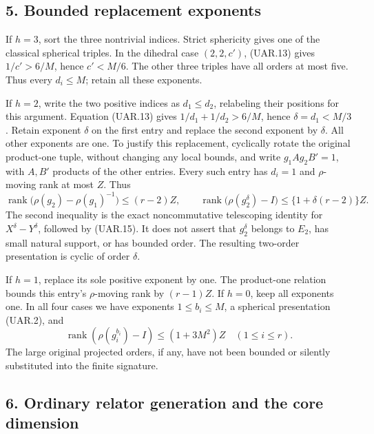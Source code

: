 \subsection*{5. Bounded replacement exponents}

If \(h=3\), sort the three nontrivial indices. Strict sphericity
gives one of the classical spherical triples. In the dihedral case
\((2,2,c')\), (UAR.13) gives \(1/c'>6/M\), hence \(c'<M/6\).
The other three triples have all orders at most five. Thus every
\(d_i\le M\); retain all these exponents.

If \(h=2\), write the two positive indices as \(d_1\le d_2\),
relabeling their positions for this argument. Equation (UAR.13)
gives \(1/d_1+1/d_2>6/M\), hence \(\delta=d_1<M/3\).
Retain exponent \(\delta\) on the first entry and replace the
second exponent by \(\delta\). All other exponents are one.
To justify this replacement, cyclically rotate the original
product-one tuple, without changing any local bounds, and write
\(g_1 A g_2 B'=1\), with \(A,B'\) products of the other entries.
Every such entry has \(d_i=1\) and \(\rho\)-moving rank at most
\(Z\). Thus
\[
 \operatorname{rank}\bigl(\rho(g_2)-\rho(g_1)^{-1}\bigr)
       \le(r-2)Z,\qquad
 \operatorname{rank}\bigl(\rho(g_2^{\delta})-I\bigr)
       \le\{1+\delta(r-2)\}Z.
 \tag{UAR.16}
\]
The second inequality is the exact noncommutative telescoping
identity for \(X^{\delta}-Y^{\delta}\), followed by (UAR.15).
It does not assert that \(g_2^{\delta}\) belongs to \(E_2\),
has small natural support, or has bounded order. The resulting
two-order presentation is cyclic of order \(\delta\).

If \(h=1\), replace its sole positive exponent by one. The
product-one relation bounds this entry's \(\rho\)-moving rank by
\((r-1)Z\). If \(h=0\), keep all exponents one.
In all four cases we have exponents \(1\le b_i\le M\), a
spherical presentation (UAR.2), and
\[
 \operatorname{rank}(\rho(g_i^{b_i})-I)
                 \le (1+3M^2)Z\quad(1\le i\le r).
 \tag{UAR.17}
\]
The large original projected orders, if any, have not been bounded
or silently substituted into the finite signature.

\subsection*{6. Ordinary relator generation and the core dimension}

